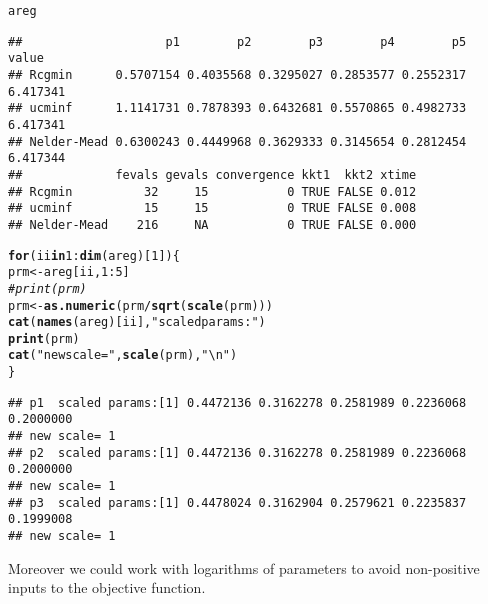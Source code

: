 \documentclass[11pt]{article}\usepackage[]{graphicx}\usepackage[]{color}
\makeatletter
\newcommand{\hlnum}[1]{\textcolor[rgb]{0.686,0.059,0.569}{#1}}%
\newcommand{\hlstr}[1]{\textcolor[rgb]{0.192,0.494,0.8}{#1}}%
\newcommand{\hlcom}[1]{\textcolor[rgb]{0.678,0.584,0.686}{\textit{#1}}}%
\newcommand{\hlopt}[1]{\textcolor[rgb]{0,0,0}{#1}}%
\newcommand{\hlstd}[1]{\textcolor[rgb]{0.345,0.345,0.345}{#1}}%
\newcommand{\hlkwa}[1]{\textcolor[rgb]{0.161,0.373,0.58}{\textbf{#1}}}%
\newcommand{\hlkwb}[1]{\textcolor[rgb]{0.69,0.353,0.396}{#1}}%
\newcommand{\hlkwd}[1]{\textcolor[rgb]{0.737,0.353,0.396}{\textbf{#1}}}%
\newenvironment{kframe}{%
 \def\at@end@of@kframe{}%
 \ifinner\ifhmode%
  \def\at@end@of@kframe{\end{minipage}}%
  \begin{minipage}{\columnwidth}%
 \fi\fi%
 \def\FrameCommand##1{\hskip\@totalleftmargin \hskip-\fboxsep
 \colorbox{shadecolor}{##1}\hskip-\fboxsep
     \hskip-\linewidth \hskip-\@totalleftmargin \hskip\columnwidth}%
 \MakeFramed {\advance\hsize-\width
   \@totalleftmargin\z@ \linewidth\hsize
   \@setminipage}}%
 {\par\unskip\endMakeFramed%
 \at@end@of@kframe}
\newenvironment{knitrout}{}{} %
\makeatother
\begin{document}
\begin{knitrout}
\begin{kframe}
{\ttfamily\noindent\color{warningcolor}{\#\# Warning in log(x/sc): NaNs produced}}

{\ttfamily\noindent\color{warningcolor}{\#\# Warning in Rcgminu(par = spar, fn = efn, gr = egr, control = mcontrol, ...): Rcgmin - undefined function}}

{\ttfamily\noindent\color{warningcolor}{\#\# Warning in log(x/sc): NaNs produced}}

{\ttfamily\noindent\color{warningcolor}{\#\# Warning in Rcgminu(par = spar, fn = efn, gr = egr, control = mcontrol, ...): Rcgmin - undefined function}}\begin{alltt}
\hlstd{areg}
\end{alltt}
\begin{verbatim}
##                    p1        p2        p3        p4        p5    value
## Rcgmin      0.5707154 0.4035568 0.3295027 0.2853577 0.2552317 6.417341
## ucminf      1.1141731 0.7878393 0.6432681 0.5570865 0.4982733 6.417341
## Nelder-Mead 0.6300243 0.4449968 0.3629333 0.3145654 0.2812454 6.417344
##             fevals gevals convergence kkt1  kkt2 xtime
## Rcgmin          32     15           0 TRUE FALSE 0.012
## ucminf          15     15           0 TRUE FALSE 0.008
## Nelder-Mead    216     NA           0 TRUE FALSE 0.000
\end{verbatim}
\begin{alltt}
\hlkwa{for} \hlstd{(ii} \hlkwa{in} \hlnum{1}\hlopt{:}\hlkwd{dim}\hlstd{(areg)[}\hlnum{1}\hlstd{])\{}
    \hlstd{prm} \hlkwb{<-} \hlstd{areg[ii,}\hlnum{1}\hlopt{:}\hlnum{5}\hlstd{]}
\hlcom{#    print(prm)}
    \hlstd{prm}\hlkwb{<-}\hlkwd{as.numeric}\hlstd{(prm}\hlopt{/}\hlkwd{sqrt}\hlstd{(}\hlkwd{scale}\hlstd{(prm)))}
    \hlkwd{cat}\hlstd{(}\hlkwd{names}\hlstd{(areg)[ii],}\hlstr{" scaled params:"}\hlstd{)}
    \hlkwd{print}\hlstd{(prm)}
    \hlkwd{cat}\hlstd{(}\hlstr{"new scale="}\hlstd{,} \hlkwd{scale}\hlstd{(prm),}\hlstr{"\textbackslash{}n"}\hlstd{)}
\hlstd{\}}
\end{alltt}
\begin{verbatim}
## p1  scaled params:[1] 0.4472136 0.3162278 0.2581989 0.2236068 0.2000000
## new scale= 1 
## p2  scaled params:[1] 0.4472136 0.3162278 0.2581989 0.2236068 0.2000000
## new scale= 1 
## p3  scaled params:[1] 0.4478024 0.3162904 0.2579621 0.2235837 0.1999008
## new scale= 1
\end{verbatim}
\end{kframe}
\end{knitrout}

Moreover we could work with logarithms of parameters to avoid non-positive inputs to the objective function.
\end{document}
